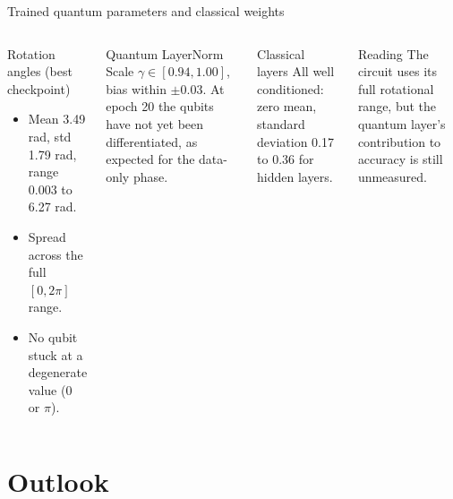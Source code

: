 \documentclass[aspectratio=169]{beamer}
\begin{document}
\begin{frame}{Trained quantum parameters and classical weights}
\begin{columns}[T,onlytextwidth]
\begin{block}{Rotation angles (best checkpoint)}
\begin{itemize}\small
  \item Mean 3.49 rad, std 1.79 rad, range 0.003 to 6.27 rad.
  \item Spread across the full $[0,2\pi]$ range.
  \item No qubit stuck at a degenerate value (0 or $\pi$).
\end{itemize}
\end{block}
\begin{block}{Quantum LayerNorm}
Scale $\gamma \in [0.94, 1.00]$, bias within $\pm 0.03$. At epoch 20 the qubits have not yet been differentiated, as expected for the data-only phase.
\end{block}
\begin{block}{Classical layers}
\small All well conditioned: zero mean, standard deviation 0.17 to 0.36 for hidden layers.
\end{block}
\begin{alertblock}{Reading}
The circuit uses its full rotational range, but the quantum layer's contribution to accuracy is still unmeasured.
\end{alertblock}
\end{columns}
\end{frame}

\section{Outlook}
\end{document}
